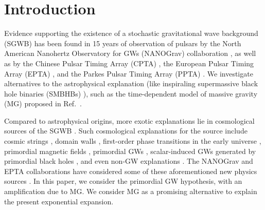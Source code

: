 \documentclass[prd,twocolumn,aps,psfig,nofootinbib,nobibnotes,superscriptaddress,preprintnumbers,times]{revtex4-2}
\begin{document}
\section{Introduction}
Evidence supporting the existence of a stochastic gravitational wave background (SGWB) has been found in 15 years of observation of pulsars by the North American Nanohertz Observatory for GWs (NANOGrav) collaboration \cite{Agazie:2023}, as well as by the Chinese Pulsar Timing Array (CPTA) \cite{Xu:2023wog}, the European Pulsar Timing Array (EPTA) \cite{EPTA:2023sfo, EPTA:2023akd, EPTA:2023fyk}, and the Parkes Pulsar Timing Array (PPTA) \cite{Zic:2023gta,Reardon:2023gzh}. We investigate alternatives to the astrophysical explanation (like inspiraling supermassive black hole binaries (SMBHBs) \cite{Rajagopal:1995,Jaffe:2002rt,Burke-Spolaor:2018bvk}), such as the time-dependent model of massive gravity (MG) proposed in Ref.\ \cite{Fujita:2018ehq}. 

Compared to astrophysical origins, more exotic explanations lie in cosmological sources of the SGWB  \cite{Maggiore:1999vm, Caprini:2018mtu, Chen:2021wdo, Wu:2021kmd, Chen:2021ncc, PPTA:2022eul, Wu:2023pbt, Wu:2023dnp, Madge:2023cak, Ellis:2023oxs}. Such cosmological explanations for the source include  cosmic strings \cite{Damour:2004kw,Siemens:2006yp, Chen:2022azo,Bian:2022tju}, domain walls \cite{Ferreira:2022zzo, Zhang:2023nrs}, first-order phase transitions in the early universe \cite{Kibble:1976sj, Vilenkin:1984ib,Caprini:2010xv, Kobakhidze:2017mru, Arunasalam:2017ajm, Xue:2021gyq, NANOGrav:2021flc, Moore:2021ibq, Addazi:2023jvg, Athron:2023xlk, Bringmann:2023opz, Ashoorioon:2022raz}, primordial magnetic fields \cite{Neronov:2020qrl,Brandenburg:2021tmp,RoperPol:2022iel,Kahniashvili:2021gym}, primordial GWs \cite{Grishchuk:1976, Grishchuk:1977zz, Starobinsky:1980te, Linde:1981mu, Fabbri:1983us, Grishchuk:2005qe, Lasky:2015lej, Kawai:2023nqs, Basilakos:2023xof, Basilakos:2023jvp}, scalar-induced GWs \cite{Tomita:1967non, Saito:2008jc, Young:2014ana, Yuan:2019udt, Yuan:2019wwo, Chen:2019xse, Cai:2019bmk, Yuan:2019fwv, Liu:2021jnw, Liu:2023ymk, Cai:2023dls, Choudhury:2023fjs, Choudhury:2023fwk, Bhattacharya:2023ysp, Choudhury:2023hfm, Kawai:2021edk} generated by primordial black holes \cite{Zeldovich:1967lct,Hawking:1971ei,Carr:1974nx,Chen:2018czv,Chen:2018rzo,Liu:2018ess,Liu:2019rnx,Chen:2019irf,Liu:2020cds,Wu:2020drm,Chen:2021nxo,Chen:2022fda,Chen:2022qvg,Liu:2022iuf,Zheng:2022wqo, Choudhury:2013woa, Franciolini:2023pbf}, and even non-GW explanations \cite{Chowdhury:2023xvy}. The NANOGrav and EPTA collaborations have considered some of these aforementioned new physics sources \cite{Afzal:2023,EPTA:2023xxk}.
In this paper, we consider the primordial GW hypothesis, with an amplification due to MG. We consider MG as a promising alternative to explain the present exponential expansion. 
\end{document}
